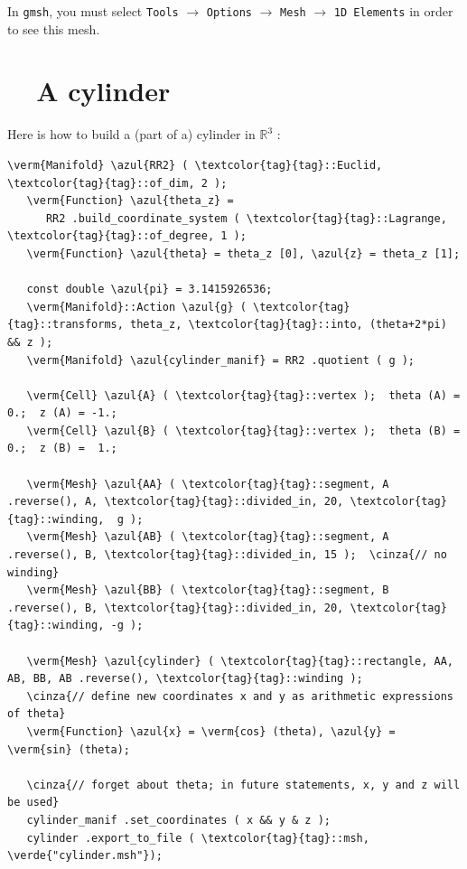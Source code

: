 In {\tt gmsh}, you must select {\small\tt Tools} $\to$ {\small\tt Options} $\to$
{\small\tt Mesh} $\to$ {\small\tt 1D Elements} in order to see this mesh.


\section{~~A cylinder}\label{\numb section 7.\numb parag 3}

Here is how to build a (part of a) cylinder in $ \mathbb{R}^3 $ :

\begin{Verbatim}[commandchars=\\\{\},formatcom=\small\tt,frame=single,
   label=parag-\ref{\numb section 7.\numb parag 3}.cpp,rulecolor=\color{coment},
   baselinestretch=0.94,framesep=2mm                                            ]
   \verm{Manifold} \azul{RR2} ( \textcolor{tag}{tag}::Euclid, \textcolor{tag}{tag}::of_dim, 2 );
   \verm{Function} \azul{theta_z} =
      RR2 .build_coordinate_system ( \textcolor{tag}{tag}::Lagrange, \textcolor{tag}{tag}::of_degree, 1 );
   \verm{Function} \azul{theta} = theta_z [0], \azul{z} = theta_z [1];

   const double \azul{pi} = 3.1415926536;
   \verm{Manifold}::Action \azul{g} ( \textcolor{tag}{tag}::transforms, theta_z, \textcolor{tag}{tag}::into, (theta+2*pi) && z );
   \verm{Manifold} \azul{cylinder_manif} = RR2 .quotient ( g );

   \verm{Cell} \azul{A} ( \textcolor{tag}{tag}::vertex );  theta (A) = 0.;  z (A) = -1.;
   \verm{Cell} \azul{B} ( \textcolor{tag}{tag}::vertex );  theta (B) = 0.;  z (B) =  1.;

   \verm{Mesh} \azul{AA} ( \textcolor{tag}{tag}::segment, A .reverse(), A, \textcolor{tag}{tag}::divided_in, 20, \textcolor{tag}{tag}::winding,  g );
   \verm{Mesh} \azul{AB} ( \textcolor{tag}{tag}::segment, A .reverse(), B, \textcolor{tag}{tag}::divided_in, 15 );  \cinza{// no winding}
   \verm{Mesh} \azul{BB} ( \textcolor{tag}{tag}::segment, B .reverse(), B, \textcolor{tag}{tag}::divided_in, 20, \textcolor{tag}{tag}::winding, -g );

   \verm{Mesh} \azul{cylinder} ( \textcolor{tag}{tag}::rectangle, AA, AB, BB, AB .reverse(), \textcolor{tag}{tag}::winding );
   \cinza{// define new coordinates x and y as arithmetic expressions of theta}
   \verm{Function} \azul{x} = \verm{cos} (theta), \azul{y} = \verm{sin} (theta);

   \cinza{// forget about theta; in future statements, x, y and z will be used}
   cylinder_manif .set_coordinates ( x && y & z );
   cylinder .export_to_file ( \textcolor{tag}{tag}::msh, \verde{"cylinder.msh"});
\end{Verbatim}

